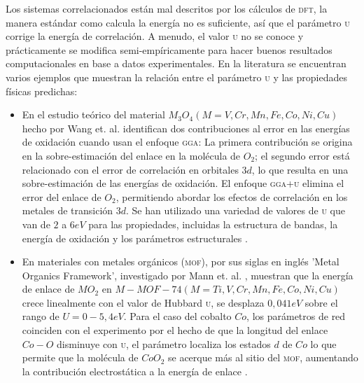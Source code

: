 Los sistemas correlacionados están mal descritos por los cálculos de \textsc{dft}\cite{Tolba2018}, la manera estándar como calcula la energía no es suficiente, así que el parámetro \textsc{u} corrige la energía de correlación. A menudo, el valor \textsc{u} no se conoce y prácticamente se modifica semi-empíricamente para hacer buenos resultados computacionales en base a datos experimentales. En la literatura se encuentran varios ejemplos que muestran la relación entre el parámetro \textsc{u} y las propiedades físicas predichas:

\begin{itemize}
    \item En el estudio teórico del material $M_{3}O_{4}(M=V, Cr, Mn, Fe, Co, Ni, Cu)$ hecho por Wang et. al. \cite{Wang2006} identifican dos contribuciones al error en las energías de oxidación cuando usan el enfoque \textsc{gga}: La primera contribución se origina en la sobre-estimación del enlace en la molécula de $O_{2}$; el segundo error está relacionado con el error de correlación en orbitales $3d$,  lo que resulta en una sobre-estimación de las energías de oxidación. El enfoque \textsc{gga+u} elimina el error del enlace de $O_{2}$, permitiendo abordar los efectos de correlación en los metales de transición $3d$. Se han utilizado una variedad de valores de \textsc{u} que van de $2$ a $6 eV$ para las propiedades, incluidas la estructura de bandas, la energía de oxidación y los parámetros estructurales \cite{Wang2006}.%
    \item En materiales con metales orgánicos (\textsc{mof}), por sus siglas en inglés '\textsc{M}etal \textsc{O}rganics \textsc{F}ramework', investigado por Mann et. al. \cite{Mann2016}, muestran que la energía de enlace de $MO_{2}$ en $M-MOF-74 (M=Ti,V,Cr,Mn,Fe,Co,Ni,Cu)$ crece linealmente con el valor de Hubbard \textsc{u}, se desplaza $0,041  eV$ sobre el rango de $U = 0-5,4  eV$. Para el caso del cobalto $Co$, los parámetros de red coinciden con el experimento por el hecho de que la longitud del enlace $Co-O$ disminuye con \textsc{u}, el parámetro localiza los estados $d$ de $Co$ lo que permite que la molécula de $CoO_{2}$ se acerque más al sitio del \textsc{mof}, aumentando la contribución electrostática a la energía de enlace \cite{Mann2016}.
     

\end{itemize}
